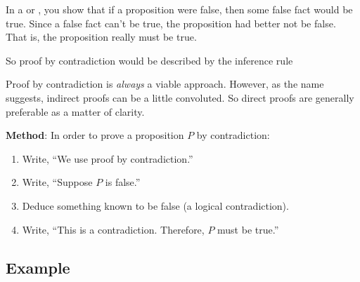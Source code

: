 \begin{problems}
\classproblems
{}
\homeworkproblems
{}
\end{problems}


In a  or , you show that
if a proposition were false, then some false fact would be true.  Since a
false fact can't be true, the proposition had better not be false.  That
is, the proposition really must be true. 

\begin{staffnotes}

So proof by
contradiction would be described by the inference rule
\begin{rul*}
\end{rul*}

\end{staffnotes}

Proof by contradiction is \emph{always} a viable approach.  However, as
the name suggests, indirect proofs can be a little convoluted.  So direct
proofs are generally preferable as a matter of clarity.

\textbf{Method}: In order to prove a proposition $P$ by contradiction:

\begin{enumerate}

\item Write, ``We use proof by contradiction.''

\item Write, ``Suppose $P$ is false.''

\item Deduce something known to be false (a logical contradiction).

\item Write, ``This is a contradiction.  Therefore, $P$ must be
true.''

\end{enumerate}

\subsection*{Example}

